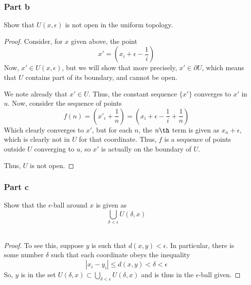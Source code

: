 \documentclass[fontsize=11pt]{scrartcl} %
\numberwithin{equation}{section} %
\numberwithin{figure}{section} %
\numberwithin{table}{section} %
\begin{document}
\subsubsection*{Part b}
Show that $U(x,\epsilon)$ is not open in the uniform topology.
\\
\begin{proof}
    Consider, for $x$ given above, the point
    \[
    x' = (x_i + \epsilon - \frac{1}{i})
    \]
    Now, $x'\in U(x,\epsilon)$, but we will show that more precisely,
    $x'\in\partial U$, which means that $U$ contains part of its boundary,
    and cannot be open.

    We note already that $x'\in U$. Thus, the constant sequence $\{x'\}$
    converges to $x'$ in $u$. Now, consider the sequence of points
    \[
        f(n) = (x'_i +\frac{1}{n}) = (x_i +\epsilon - \frac{1}{i}+\frac{1}{n})
    \]
    Which clearly converges to $x'$, but for each $n$, the $n\th$ term is
    given as $x_n+\epsilon$, which is clearly not in $U$ for that coordinate.
    Thus, $f$ is a sequence of points outside $U$ converging to $u$, so $x'$
    is actually on the boundary of $U$.

    Thus, $U$ is not open.
\end{proof}

\subsubsection*{Part c}
Show that the $\epsilon$-ball around $x$ is given as
\[
    \bigcup_{\delta<\epsilon} U(\delta,x)
\]
\\
\begin{proof}
To see this, suppose $y$ is such that $d(x,y) < \epsilon$. In particular, there
    is some number $\delta$ such that each coordinate obeys the inequality
\[
    |x_i-y_i| \leq d(x,y) < \delta < \epsilon
\]
So, $y$ is in the set $U(\delta,x)\subset\bigcup_{\delta < \epsilon}
    U(\delta,x)$ and is thus in the $\epsilon$-ball given.
\end{proof}
\pagebreak
\end{document}
